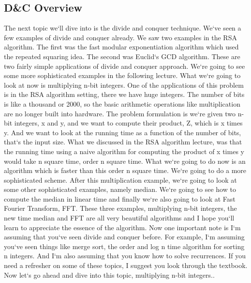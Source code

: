 \subsection{D\&C  Overview}
The next topic we`ll dive into is the divide and conquer technique.
We`ve seen a few examples of divide and conquer already.
We saw two examples in the RSA algorithm.
The first was the fast modular exponentiation algorithm which used the repeated squaring idea.
The second was Euclid`s GCD algorithm.
These are two fairly simple applications of divide and conquer approach.
We`re going to see some more sophisticated examples in the following lecture.
What we`re going to look at now is multiplying n-bit integers.
One of the applications of this problem is in the RSA algorithm setting, there we have huge integers.
The number of bits is like a thousand or 2000, so the basic arithmetic operations like multiplication are no longer built into hardware.
The problem formulation is we`re given two n-bit integers, x and y, and we want to compute their product, Z, which is x times y.
And we want to look at the running time as a function of the number of bits, that`s the input size.
What we discussed in the RSA algorithm lecture, was that the running time using a naive algorithm for computing the product of x times y would take n square time, order n square time.
What we`re going to do now is an algorithm which is faster than this order n square time.
We`re going to do a more sophisticated scheme.
After this multiplication example, we`re going to look at some other sophisticated examples, namely median.
We`re going to see how to compute the median in linear time and finally we`re also going to look at Fast Fourier Transform, FFT\@.
These three examples, multiplying n-bit integers, the new time median and FFT are all very beautiful algorithms and I hope you`ll learn to appreciate the essence of the algorithm.
Now one important note is I`m assuming that you`ve seen divide and conquer before.
For example, I`m assuming you`ve seen things like merge sort, the order and log n time algorithm for sorting n integers.
And I`m also assuming that you know how to solve recurrences.
If you need a refresher on some of these topics, I suggest you look through the textbook.
Now let`s go ahead and dive into this topic, multiplying n-bit integers..

